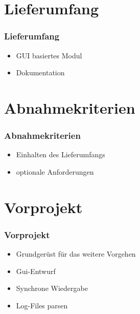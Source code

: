 \documentclass[12pt, xcolor=table]{beamer}
\begin{document}
\section{Lieferumfang}
\begin{frame}
	\frametitle{Lieferumfang}
	\begin{itemize}
		\item GUI basiertes Modul 
		\item Dokumentation
	\end{itemize}
\end{frame}

\section{Abnahmekriterien}
\begin{frame}
	\frametitle{Abnahmekriterien}
	\begin{itemize}
		\item Einhalten des Lieferumfangs
		\item optionale Anforderungen
        \end{itemize}
\end{frame}

\section{Vorprojekt}
\begin{frame}
	\frametitle{Vorprojekt}
		\begin{itemize}
		\item Grundger{\"u}st f{\"u}r das weitere Vorgehen
		\item Gui-Entwurf
		\item Synchrone Wiedergabe
		\item Log-Files parsen
        \end{itemize}
\end{frame}
\end{document}
